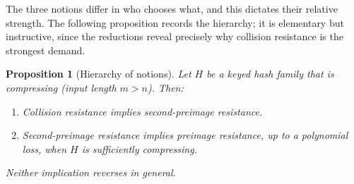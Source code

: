 \documentclass[11pt,a4paper]{article}
\newtheorem{proposition}[theorem]{Proposition}
\theoremstyle{definition}
\theoremstyle{remark}
\begin{document}
The three notions differ in who chooses what, and this dictates their relative strength. The following proposition records the hierarchy; it is elementary but instructive, since the reductions reveal precisely why collision resistance is the strongest demand.

\begin{proposition}[Hierarchy of notions]\label{hash:prop:hierarchy}
Let \(H\) be a keyed hash family that is compressing (input length \(m > n\)). Then:
\begin{enumerate}
  \item Collision resistance implies second-preimage resistance.
  \item Second-preimage resistance implies preimage resistance, up to a polynomial loss, when \(H\) is sufficiently compressing.
\end{enumerate}
Neither implication reverses in general.
\end{proposition}
\end{document}

